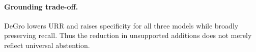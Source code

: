 \documentclass[sigconf,anonymous]{aamas}
\begin{document}

\paragraph{Grounding trade-off.}
DeGro lowers URR and raises specificity for all three models while broadly preserving recall. Thus the reduction in unsupported additions does not merely reflect universal abstention.
\end{document}
